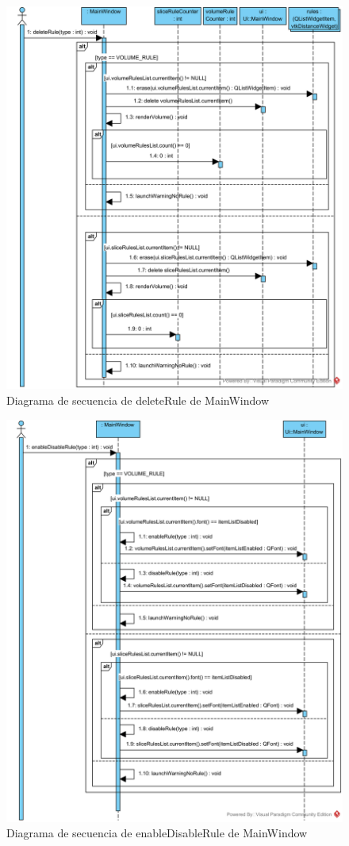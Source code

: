 \begin{figure}[H]
	\centering
	\includegraphics[width=12cm]{imagenes/diagramas/secuencia/MainWindow_DeleteRule}
	\caption{Diagrama de secuencia de deleteRule de MainWindow}
	\label{fig:diagrama_secuencia_mainWindow_deleteRule}
\end{figure}

\begin{figure}[H]
	\centering
	\includegraphics[width=12cm]{imagenes/diagramas/secuencia/MainWindow_EnableDisableRule}
	\caption{Diagrama de secuencia de enableDisableRule de MainWindow}
	\label{fig:diagrama_secuencia_mainWindow_enableDisableRule}
\end{figure}

